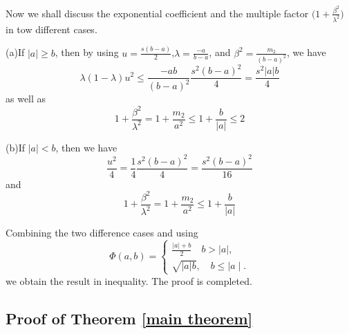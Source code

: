 \documentclass[journal]{IEEEtran}
\begin{document}
\begin{IEEEproof}
 Now we shall discuss the exponential coefficient and the multiple factor $\big(1+\frac{\beta^2}{\lambda^2}\big)$ in tow different cases.


 (a)\quad If $|a|\geq b$, then by using $u=\frac{s(b-a)}{2}$,$\lambda=\frac{-a}{b-a}$, and $\beta^2=\frac{m_2}{(b-a)^2}$, we have
 \begin{equation}
  \lambda(1-\lambda)u^2\leq \frac{-ab}{(b-a)^2}\frac{s^2(b-a)^2}{4}=\frac{s^2|a|b}{4}
 \end{equation}
 as well as
 \begin{equation}
  1+\frac{\beta^2}{\lambda^2}=1+\frac{m_2}{a^2}\leq 1+\frac{b}{|a|}\leq 2
 \end{equation}


(b)\quad If $|a|<b$, then we have
\begin{equation}
  \frac{u^2}{4}=\frac{1}{4}\frac{s^2(b-a)^2}{4}=\frac{s^2(b-a)^2}{16}
 \end{equation}
 and
 \begin{equation}
  1+\frac{\beta^2}{\lambda^2}=1+\frac{m_2}{a^2}\leq 1+\frac{b}{|a|}
 \end{equation}

Combining the two difference cases and using
 \begin{equation*}
  \Phi(a,b)=\begin{cases} \frac{|a|+b}{2}\quad b >\mid a\mid, \\
  \sqrt{|a|b},\quad b\leq \mid a\mid.
  \end{cases}
\end{equation*}
 we obtain the result in inequality. The proof is completed.
\end{IEEEproof}

\subsection{Proof of Theorem \ref{main theorem}}
\end{document}
